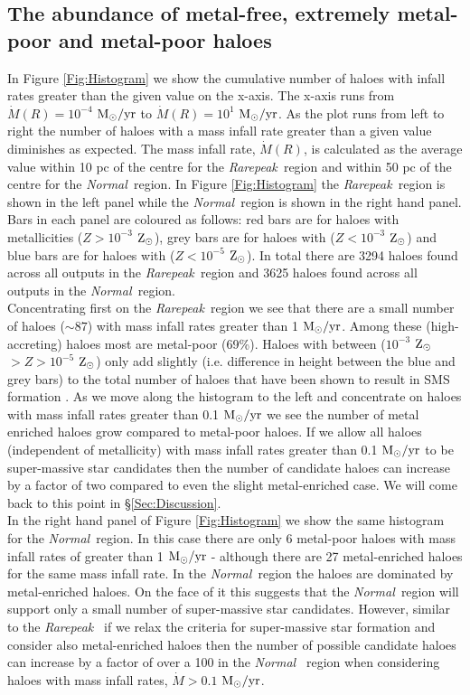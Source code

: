 \documentclass[graphics, twocolumn, usenatbib]{mn2e}
\newcommand{\msolaryr} {$\rm{M_{\odot}/yr}~$}
\newcommand{\msolaryrc} {$\rm{M_{\odot}/yr}$}
\newcommand{\zsolar} {$\rm{Z_{\odot}}~$}
\newcommand{\zsolarc} {$\rm{Z_{\odot}}$}
\newcommand{\rarepeak} {\textit{Rarepeak~}}
\newcommand{\normal} {\textit{Normal~}}
\begin{document}
\subsection{The abundance of metal-free, extremely metal-poor and metal-poor haloes}
In Figure \ref{Fig:Histogram} we show the cumulative number of haloes with infall rates greater than
the given value on the x-axis. The x-axis runs from $\dot{M}(R) = 10^{-4}$ \msolaryr to 
$\dot{M}(R) = 10^{1}$ \msolaryrc. As the plot runs from left to right the number of haloes with a
mass infall rate greater than a given value diminishes as expected. The mass infall rate,
$\dot{M}(R)$, is calculated as the average value within 10 pc of the centre for the \rarepeak region
and within 50 pc of the centre for the \normal region. In Figure  \ref{Fig:Histogram} the
\rarepeak region is shown in the left panel while the \normal region is shown in the right hand
panel. Bars in each panel are coloured as follows: red bars are for haloes with metallicities
($Z > 10^{-3}$ \zsolarc), grey bars are for haloes with ($Z < 10^{-3}$ \zsolarc) and blue bars are for
haloes with ($Z < 10^{-5}$ \zsolarc). In total there are 3294 haloes found across all outputs in
the \rarepeak region and 3625 haloes found across all outputs in the \normal region. \\
\indent Concentrating first on the \rarepeak region we see that there are a small number of
haloes ($\sim 87$) with mass infall rates greater than 1 \msolaryrc. Among these (high-accreting)
haloes most are metal-poor (69\%). Haloes with between
($10^{-3}$ \zsolar $> Z > 10^{-5}$ \zsolarc) only add slightly (i.e. difference in height between the
blue and grey bars) to the total number of haloes that
have been shown to result in SMS formation \citep{Chon_2020}. As we move along the histogram to the
left and concentrate on haloes with mass infall rates greater than 0.1 \msolaryr we see the
number of metal enriched haloes grow compared to
metal-poor haloes. If we allow all haloes (independent of metallicity) with mass infall rates greater
than  0.1 \msolaryr to be super-massive star candidates then the number of candidate haloes can
increase by a factor of two compared to even the slight metal-enriched case. We will
come back to this point in \S \ref{Sec:Discussion}. \\
\indent In the right hand panel of Figure \ref{Fig:Histogram}
we show the same histogram for the \normal region. In this case there are only 6 metal-poor haloes
with mass infall rates of greater than 1 \msolaryr - although there are 27 
metal-enriched haloes for the same mass infall rate. In the
\normal region the haloes are dominated by metal-enriched haloes.
On the face of it this suggests that the \normal region will
support only a small number of super-massive star candidates. However, similar to the \rarepeak
if we relax the criteria for super-massive star formation and consider also metal-enriched haloes
then the number of possible candidate haloes can increase by a factor of over a 100 in the \normal
region when considering haloes with mass infall rates, $\dot{M} > 0.1 $ \msolaryrc. 
\end{document}
